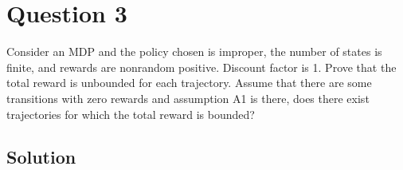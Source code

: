 \section*{Question 3}

Consider an MDP and the policy chosen is improper, the number of states is finite, and rewards are nonrandom positive.
Discount factor is 1.
Prove that the total reward is unbounded for each trajectory.
Assume that there are some transitions with zero rewards and assumption A1 is there, does there exist trajectories for which the total reward is bounded?

\subsection*{Solution}
